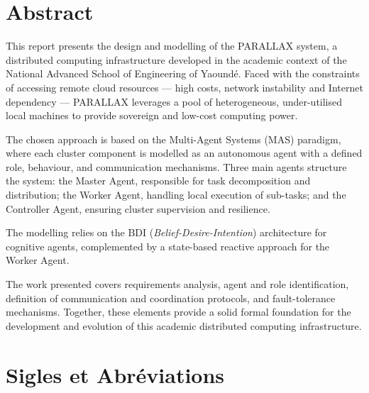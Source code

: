 \documentclass[12pt,a4paper]{report}
\begin{document}
\chapter*{Abstract}

This report presents the design and modelling of the PARALLAX system, a distributed computing infrastructure developed in the academic context of the National Advanced School of Engineering of Yaoundé. Faced with the constraints of accessing remote cloud resources — high costs, network instability and Internet dependency — PARALLAX leverages a pool of heterogeneous, under-utilised local machines to provide sovereign and low-cost computing power.

The chosen approach is based on the Multi-Agent Systems (MAS) paradigm, where each cluster component is modelled as an autonomous agent with a defined role, behaviour, and communication mechanisms. Three main agents structure the system: the Master Agent, responsible for task decomposition and distribution; the Worker Agent, handling local execution of sub-tasks; and the Controller Agent, ensuring cluster supervision and resilience.

The modelling relies on the BDI (\textit{Belief-Desire-Intention}) architecture for cognitive agents, complemented by a state-based reactive approach for the Worker Agent.

The work presented covers requirements analysis, agent and role identification, definition of communication and coordination protocols, and fault-tolerance mechanisms. Together, these elements provide a solid formal foundation for the development and evolution of this academic distributed computing infrastructure.

\tableofcontents

\tableofcontents
\newpage

\chapter*{Sigles et Abréviations}
\end{document}
